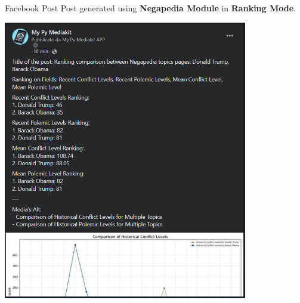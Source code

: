 \documentclass{beamer}
\begin{document}
    \begin{frame}{Facebook Post}
        Post generated using \textbf{Negapedia Module} in \textbf{Ranking Mode}.
        \begin{center}
            \includegraphics[width=0.8\textwidth, keepaspectratio]{images/facebook_negapedia_ranking_post_screenshot.png}
        \end{center}
    \end{frame}
\end{document}
